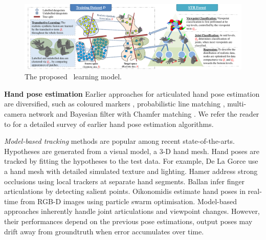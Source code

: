 \begin{figure}[ht]
	\hspace{-4mm}
	\includegraphics[width=1.03\linewidth]{fig/hand/fig2.pdf}
	\caption{The proposed \STR\ learning model.}
	\label{fig/hand/concept}
\end{figure}

\noindent\textbf{Hand pose estimation} Earlier approaches for articulated hand pose estimation are diversified, such as coloured markers \cite{Chua2002}, probabilistic line matching \cite{Athitsos2003}, multi-camera network \cite{Guan2006} and Bayesian filter with Chamfer matching \cite{Stenger2006}. 
We refer the reader to \cite{Erol2007} for a detailed survey of earlier hand pose estimation algorithms. 

\emph{Model-based tracking} methods are popular among recent state-of-the-arts. Hypotheses are generated from a visual model, \eg a 3-D hand mesh. Hand poses are tracked by fitting the hypotheses to the test data. For example, De La Gorce \etal \cite{LaGorce2011} use a hand mesh with detailed simulated texture and lighting. Hamer \etal \cite{Hamer2009} address strong occlusions using local trackers at separate hand segments. Ballan \etal \cite{Ballan2012} infer finger articulations by detecting salient points.  
Oikonomidis \etal \cite{Oikonomidis2011} estimate hand poses in real-time from RGB-D images using particle swarm optimisation. Model-based approaches inherently handle joint articulations and viewpoint changes. 
However, their performances depend on the previous pose estimations, output poses may drift away from groundtruth when error accumulates over time. 

